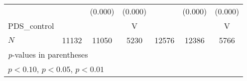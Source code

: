 \documentclass[11pt, letterpaper]{article}
\begin{document}
{\begin{tabular}{l*{6}{c}}
            &                     &     (0.000)         &     (0.000)         &                     &     (0.000)         &     (0.000)         \\
[1em]
PDS\_control  &                     &                    &      V             &                   &                 &      V \\
\hline
\(N\)       &       11132         &       11050         &        5230         &       12576         &       12386         &        5766         \\
\hline\hline
\multicolumn{7}{l}{\footnotesize \textit{p}-values in parentheses}\\
\multicolumn{7}{l}{\footnotesize \sym{*} \(p<0.10\), \sym{**} \(p<0.05\), \sym{***} \(p<0.01\)}\\
\end{tabular}
}
\end{document}
